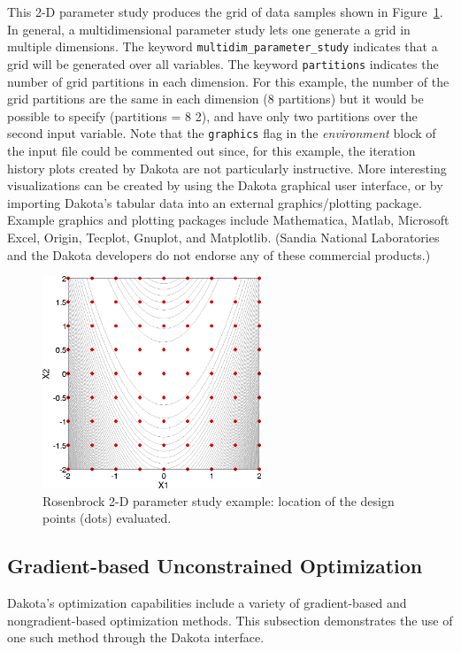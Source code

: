 This 2-D parameter study produces the grid of data samples shown in
Figure~\ref{tutorial:rosenbrock_multidim_graphics}. In general, a multidimensional 
parameter study lets one generate a grid in multiple dimensions. 
The keyword \texttt{multidim\_parameter\_study} indicates that 
a grid will be generated over all variables. The keyword 
\texttt{partitions} indicates the number of grid partitions in 
each dimension. For this example, the number of the grid partitions 
are the same in each dimension (8 partitions) but it would be possible 
to specify (partitions = 8 2), and have only two partitions 
over the second input variable.  Note that the
\texttt{graphics} flag in the \emph{environment} block of the input
file could be commented out since, for this example, the iteration
history plots created by Dakota are not particularly instructive. More
interesting visualizations can be created by using the Dakota
graphical user interface, or by importing Dakota's tabular data into
an external graphics/plotting package. Example graphics and plotting
packages include Mathematica, Matlab, Microsoft Excel, Origin,
Tecplot, Gnuplot, and Matplotlib. (Sandia National Laboratories and
the Dakota developers do not endorse any of these commercial
products.)

\begin{figure}[htb!]
  \centering
  \includegraphics[height=2.5in]{images/rosen_2d_pts}
  \caption{Rosenbrock 2-D parameter study example:
  location of the design points (dots) evaluated.}
  \label{tutorial:rosenbrock_multidim_graphics}
\end{figure}


\subsection{Gradient-based Unconstrained Optimization}\label{tutorial:examples:optimization}

Dakota's optimization capabilities include a variety of gradient-based 
and nongradient-based optimization methods. This subsection demonstrates
the use of one such method through the Dakota interface.

